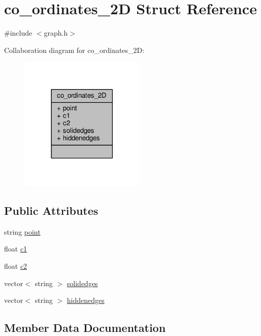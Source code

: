 \hypertarget{structco__ordinates__2D}{}\section{co\+\_\+ordinates\+\_\+2D Struct Reference}
\label{structco__ordinates__2D}


{\ttfamily \#include $<$graph.\+h$>$}



Collaboration diagram for co\+\_\+ordinates\+\_\+2D\+:
\nopagebreak
\begin{figure}[H]
\begin{center}
\leavevmode
\includegraphics[width=170pt]{structco__ordinates__2D__coll__graph}
\end{center}
\end{figure}
\subsection*{Public Attributes}
\begin{DoxyCompactItemize}
\item 
string \hyperlink{structco__ordinates__2D_a670541bafcbb4094ed3423f655a66cf6}{point}
\item 
float \hyperlink{structco__ordinates__2D_a215c40478ad8333a7c0ab634a6bad587}{c1}
\item 
float \hyperlink{structco__ordinates__2D_ab2320185357bf9635b33b98edb8087f1}{c2}
\item 
vector$<$ string $>$ \hyperlink{structco__ordinates__2D_ab653d4ba438344c0564e74338b58d822}{solidedges}
\item 
vector$<$ string $>$ \hyperlink{structco__ordinates__2D_af5578efed44d03526239551b041aded4}{hiddenedges}
\end{DoxyCompactItemize}


\subsection{Member Data Documentation}
